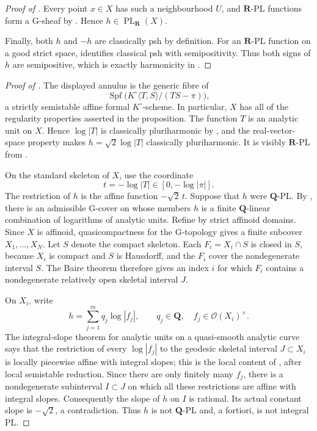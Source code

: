 \begin{proof}[Proof of ]
Every point \(x\in X\) has such a neighbourhood \(U\), and
\(\mathbf R\)-PL functions form a G-sheaf by
\cite[\S5.2(4)]{GJR26}.  Hence
\(h\in\operatorname{PL}_{\mathbf R}(X)\).

Finally, both \(h\) and \(-h\) are classically psh by definition.  For an
\(\mathbf R\)-PL function on a good strict space,
\cite[Theorem~4.3]{GR25Classical} identifies classical psh with
semipositivity.  Thus both signs of \(h\) are semipositive, which is exactly
harmonicity in \cite[Definition~7.2]{GJR26}.
\end{proof}

\begin{proof}[Proof of ]
The displayed annulus is the generic fibre of
\[
 \operatorname{Spf}
 \bigl(K^\circ\langle T,S\rangle/(TS-\pi)\bigr),
\]
a strictly semistable affine formal \(K^\circ\)-scheme.  In particular,
\(X\) has all of the regularity properties asserted in the proposition.
The function \(T\) is an analytic unit on \(X\).  Hence \(\log|T|\) is
classically pluriharmonic by \cite[Proposition~7.2(2)]{GR25Classical}, and
the real-vector-space property
\cite[Proposition~7.2(3)]{GR25Classical} makes
\(h=\sqrt2\log|T|\) classically pluriharmonic.  It is visibly
\(\mathbf R\)-PL from \cite[Definition~5.1]{GJR26}.

On the standard skeleton of \(X\), use the coordinate
\[
                   t=-\log|T|\in[0,-\log|\pi|].
\]
The restriction of \(h\) is the affine function \(-\sqrt2\,t\).  Suppose
that \(h\) were \(\mathbf Q\)-PL.  By
\cite[Definition~5.1]{GJR26}, there is an admissible G-cover on whose
members \(h\) is a finite \(\mathbf Q\)-linear combination of logarithms of
analytic units.  Refine by strict affinoid domains.  Since \(X\) is
affinoid, quasicompactness for the G-topology gives a finite subcover
\(X_1,\ldots,X_N\).  Let \(S\) denote the compact skeleton.  Each
\(F_i=X_i\cap S\) is closed in \(S\), because \(X_i\) is compact and \(S\)
is Hausdorff, and the \(F_i\) cover the nondegenerate interval \(S\).
The Baire theorem therefore gives an index \(i\) for which \(F_i\) contains
a nondegenerate relatively open skeletal interval \(J\).

On \(X_i\), write
\[
                         h=\sum_{j=1}^m q_j\log|f_j|,
             \qquad q_j\in\mathbf Q,\quad f_j\in\mathscr O(X_i)^\times.
\]
The integral-slope theorem for analytic units on a quasi-smooth analytic
curve says that the restriction of every \(\log|f_j|\) to the geodesic
skeletal interval \(J\subset X_i\) is locally piecewise affine with integral
slopes; this is the local content of
\cite[Proposition~2.2.24(i)]{Thu05}, after local semistable reduction.  Since
there are only finitely many \(f_j\), there is a nondegenerate subinterval
\(I\subset J\) on which all these restrictions are affine with integral
slopes.  Consequently the slope of \(h\) on \(I\) is rational.  Its actual
constant slope is \(-\sqrt2\), a
contradiction.  Thus \(h\) is not \(\mathbf Q\)-PL and, a fortiori, is not
integral PL.
\end{proof}
